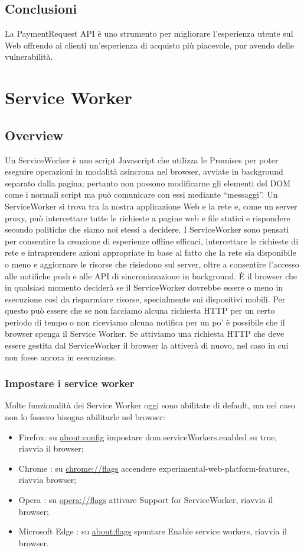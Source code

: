 \documentclass[11pt ,a4paper , twoside , openright ]{article}
\begin{document}
\subsection{Conclusioni}
La PaymentRequest API è uno strumento per migliorare l'esperienza utente sul Web offrendo ai clienti un'esperienza di acquisto più piacevole, pur avendo delle vulnerabilità.
\newpage

\section{Service Worker}
\subsection{Overview}
Un ServiceWorker è uno script Javascript che utilizza le Promises per poter eseguire operazioni in modalità asincrona nel browser, avviate in background separato dalla pagina; pertanto non possono modificarne gli elementi del DOM come i normali script ma può comunicare con essi mediante “messaggi”.
Un ServiceWorker si trova tra la nostra applicazione Web e la rete e, come un server proxy, può intercettare tutte le richieste a pagine web e file statici e rispondere secondo politiche che siamo noi stessi a decidere.
I ServiceWorker sono pensati per consentire la creazione di esperienze offline efficaci, intercettare le richieste di rete e intraprendere azioni appropriate in base al fatto che la rete sia disponibile o meno e aggiornare le risorse che risiedono sul server, oltre a consentire l'accesso alle notifiche push e alle API di sincronizzazione in background.
È il browser che in qualsiasi momento deciderà se il ServiceWorker dovrebbe essere o meno in esecuzione così da risparmiare risorse, specialmente sui dispositivi mobili. Per questo può essere che se non facciamo alcuna richiesta HTTP per un certo periodo di tempo o non riceviamo alcuna notifica per un po' è possibile che il browser spenga il Service Worker. Se attiviamo una richiesta HTTP che deve essere gestita dal ServiceWorker il browser la attiverà di nuovo, nel caso in cui non fosse ancora in esecuzione. 

\subsubsection{Impostare i service worker}
Molte funzionalità dei Service Worker oggi sono abilitate di default, ma nel caso non lo fossero bisogna abilitarle nel browser:
\begin{itemize}
	\item Firefox: su \url{about:config} impostare dom.serviceWorkers.enabled su true, riavvia il browser;
	\item Chrome : su \url{chrome://flags} accendere  experimental-web-platform-features, riavvia browser;
	\item Opera : su \url{opera://flags} attivare Support for ServiceWorker, riavvia il browser;
	\item Microsoft Edge : su \url{about:flags} spuntare  Enable service workers, riavvia il browser.
\end{itemize}
\end{document}
